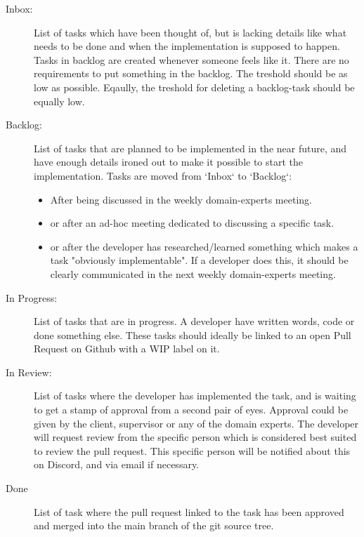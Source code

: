 \begin{description}
    
    \item[Inbox:] List of tasks which have been thought of, but is lacking details like what needs to be done and when the implementation is supposed to happen. Tasks in backlog are created whenever someone feels like it. There are no requirements to put something in the backlog. The treshold should be as low as possible. Eqaully, the treshold for deleting a backlog-task should be equally low.
    
    \item[Backlog:] List of tasks that are planned to be implemented in the near future, and have enough details ironed out to make it possible to start the implementation. Tasks are moved from `Inbox` to `Backlog`:
        \begin{itemize}
            \item After being discussed in the weekly domain-experts meeting.
            \item or after an ad-hoc meeting dedicated to discussing a specific task.
            \item or after the developer has researched/learned something which makes a task "obviously implementable". If a developer does this, it should be clearly communicated in the next weekly domain-experts meeting.
        \end{itemize}

    \item[In Progress:] List of tasks that are in progress. A developer have written words, code or done something else. These tasks should ideally be linked to an open Pull Request on Github with a WIP label on it.

    \item[In Review:] List of tasks where the developer has implemented the task, and is waiting to get a stamp of approval from a second pair of eyes. Approval could be given by the client, supervisor or any of the domain experts. The developer will request review from the specific person which is considered best suited to review the pull request. This specific person will be notified about this on Discord, and via email if necessary.

    \item[Done] List of task where the pull request linked to the task has been approved and merged into the main branch of the git source tree.

\end{description}


